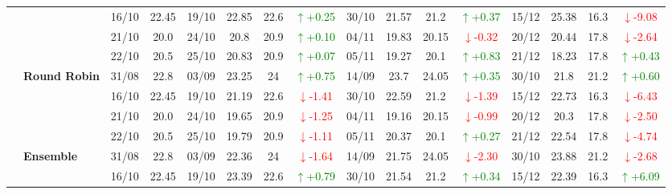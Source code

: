 {\begin{longtable}{llcc|cccc|cccc|cccc}
& 
& 16/10 & 22.45 & 19/10 & 22.85 & 22.6 & \textcolor{green}{\(\uparrow\)+0.25} & 30/10 & 21.57 & 21.2 & \textcolor{green}{\(\uparrow\)+0.37} & 15/12 & 25.38 & 16.3 & \textcolor{red}{\(\downarrow\)-9.08} \\

& 
& 21/10 & 20.0 & 24/10 & 20.8 & 20.9 & \textcolor{green}{\(\uparrow\)+0.10} & 04/11 & 19.83 & 20.15 & \textcolor{red}{\(\downarrow\)-0.32} & 20/12 & 20.44 & 17.8 & \textcolor{red}{\(\downarrow\)-2.64} \\

&
& 22/10 & 20.5 & 25/10 & 20.83 & 20.9 & \textcolor{green}{\(\uparrow\)+0.07} & 05/11 & 19.27 & 20.1 & \textcolor{green}{\(\uparrow\)+0.83} & 21/12 & 18.23 & 17.8 & \textcolor{green}{\(\uparrow\)+0.43} \\
\cmidrule(lr){2-16}


& \textbf{Round Robin}
& 31/08 & 22.8 & 03/09 & 23.25 & 24 & \textcolor{green}{\(\uparrow\)+0.75} & 14/09 & 23.7 & 24.05 & \textcolor{green}{\(\uparrow\)+0.35} & 30/10 & 21.8 & 21.2 & \textcolor{green}{\(\uparrow\)+0.60} \\

&
& 16/10 & 22.45 & 19/10 & 21.19 & 22.6 & \textcolor{red}{\(\downarrow\)-1.41} & 30/10 & 22.59 & 21.2 & \textcolor{red}{\(\downarrow\)-1.39} & 15/12 & 22.73 & 16.3 & \textcolor{red}{\(\downarrow\)-6.43} \\

&
& 21/10 & 20.0 & 24/10 & 19.65 & 20.9 & \textcolor{red}{\(\downarrow\)-1.25} & 04/11 & 19.16 & 20.15 & \textcolor{red}{\(\downarrow\)-0.99} & 20/12 & 20.3 & 17.8 & \textcolor{red}{\(\downarrow\)-2.50} \\

&
& 22/10 & 20.5 & 25/10 & 19.79 & 20.9 & \textcolor{red}{\(\downarrow\)-1.11} & 05/11 & 20.37 & 20.1 & \textcolor{green}{\(\uparrow\)+0.27} & 21/12 & 22.54 & 17.8 & \textcolor{red}{\(\downarrow\)-4.74} \\
\cmidrule(lr){2-16}


& \textbf{Ensemble}
& 31/08 & 22.8 & 03/09 & 22.36 & 24 & \textcolor{red}{\(\downarrow\)-1.64} & 14/09 & 21.75 & 24.05 & \textcolor{red}{\(\downarrow\)-2.30} & 30/10 & 23.88 & 21.2 & \textcolor{red}{\(\downarrow\)-2.68} \\

&
& 16/10 & 22.45 & 19/10 & 23.39 & 22.6 & \textcolor{green}{\(\uparrow\)+0.79} & 30/10 & 21.54 & 21.2 & \textcolor{green}{\(\uparrow\)+0.34} & 15/12 & 22.39 & 16.3 & \textcolor{green}{\(\uparrow\)+6.09} \\


\end{longtable}}
